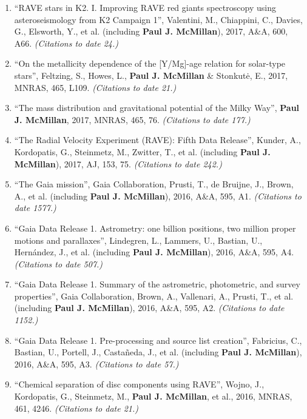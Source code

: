 \documentclass{resume}
\begin{document}
\begin{enumerate}
\item ``RAVE stars in K2. I. Improving RAVE red giants spectroscopy using asteroseismology from K2 Campaign 1'', Valentini, M., Chiappini, C., Davies, G., Elsworth, Y., et al. (including \textbf{Paul J. McMillan}), 2017, A\&A, 600, A66. \textit{(Citations to date 24.)}

\item ``On the metallicity dependence of the [Y/Mg]-age relation for solar-type stars'', Feltzing, S., Howes, L., \textbf{Paul J. McMillan} \& Stonkut\.{e}, E., 2017, MNRAS, 465, L109. \textit{(Citations to date 21.)}

\item ``The mass distribution and gravitational potential of the Milky Way'', \textbf{Paul J. McMillan}, 2017, MNRAS, 465, 76. \textit{(Citations to date 177.)}

\item ``The Radial Velocity Experiment (RAVE): Fifth Data Release'', Kunder, A., Kordopatis, G., Steinmetz, M., Zwitter, T., et al. (including \textbf{Paul J. McMillan}), 2017, AJ, 153, 75. \textit{(Citations to date 242.)}

\item ``The Gaia mission'', Gaia Collaboration, Prusti, T., de Bruijne, J., Brown, A., et al. (including \textbf{Paul J. McMillan}), 2016, A\&A, 595, A1. \textit{(Citations to date 1577.)}

\item ``Gaia Data Release 1. Astrometry: one billion positions, two million proper motions and parallaxes'', Lindegren, L., Lammers, U., Bastian, U., Hern\'andez, J., et al. (including \textbf{Paul J. McMillan}), 2016, A\&A, 595, A4. \textit{(Citations to date 507.)}

\item ``Gaia Data Release 1. Summary of the astrometric, photometric, and survey properties'', Gaia Collaboration, Brown, A., Vallenari, A., Prusti, T., et al. (including \textbf{Paul J. McMillan}), 2016, A\&A, 595, A2. \textit{(Citations to date 1152.)}

\item ``Gaia Data Release 1. Pre-processing and source list creation'', Fabricius, C., Bastian, U., Portell, J., Casta\~neda, J., et al. (including \textbf{Paul J. McMillan}), 2016, A\&A, 595, A3. \textit{(Citations to date 57.)}

\item ``Chemical separation of disc components using RAVE'', Wojno, J., Kordopatis, G., Steinmetz, M., \textbf{Paul J. McMillan}, et al., 2016, MNRAS, 461, 4246. \textit{(Citations to date 21.)}


\end{enumerate}
\end{document}

